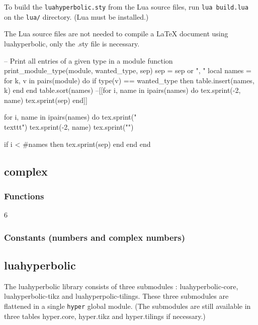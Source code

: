 \documentclass{article}
\begin{document}
To build the \verb+luahyperbolic.sty+ from the Lua source files, run \verb+lua build.lua+ on the \verb+lua/+ directory. (Lua must be installed.)

The Lua source files are not needed to compile a LaTeX document using luahyperbolic, only the .sty file is necessary.

\begin{luacode*}
-- Print all entries of a given type in a module
function print_module_type(module, wanted_type, sep)
    sep = sep or ", "
    local names = {}
    for k, v in pairs(module) do
        if type(v) == wanted_type then
            table.insert(names, k)
        end
    end
    table.sort(names)
    --[[for i, name in ipairs(names) do
        tex.sprint(-2, name)
        tex.sprint(sep)
    end]]
    
    for i, name in ipairs(names) do
        tex.sprint("\\texttt{")
        tex.sprint(-2, name)
        tex.sprint("}")
       
        if i < #names then
            tex.sprint(sep)
        end
	end
end
\end{luacode*}

\subsection{complex}
\subsubsection*{Functions}
\begin{multicols}{6}
\noindent{}
\end{multicols}
\subsubsection*{Constants (numbers and complex numbers)}



\subsection{luahyperbolic}

The luahyperbolic library consists of three submodules : luahyperbolic-core,  luahyperbolic-tikz and luahyperpolic-tilings. These three submodules are flattened in a single \texttt{hyper} global module. (The submodules are still available in three tables hyper.core, hyper.tikz and hyper.tilings if necessary.)
\end{document}
